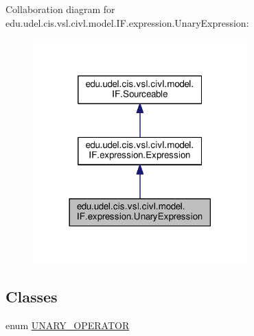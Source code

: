 Collaboration diagram for edu.\+udel.\+cis.\+vsl.\+civl.\+model.\+I\+F.\+expression.\+Unary\+Expression\+:
\nopagebreak
\begin{figure}[H]
\begin{center}
\leavevmode
\includegraphics[width=234pt]{interfaceedu_1_1udel_1_1cis_1_1vsl_1_1civl_1_1model_1_1IF_1_1expression_1_1UnaryExpression__coll__graph}
\end{center}
\end{figure}
\subsection*{Classes}
\begin{DoxyCompactItemize}
\item 
enum \hyperlink{enumedu_1_1udel_1_1cis_1_1vsl_1_1civl_1_1model_1_1IF_1_1expression_1_1UnaryExpression_1_1UNARY__OPERATOR}{U\+N\+A\+R\+Y\+\_\+\+O\+P\+E\+R\+A\+T\+O\+R}
\end{DoxyCompactItemize}
